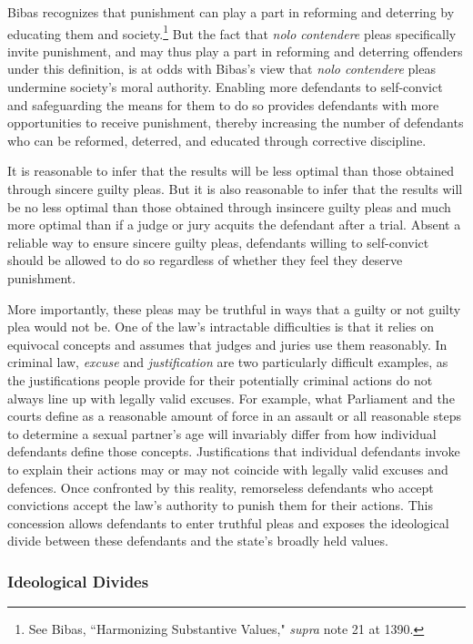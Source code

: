 Bibas recognizes that punishment can play a part in reforming and deterring by educating them and society.\footnote{See Bibas, ``Harmonizing Substantive Values," \textit{supra} note 21 at 1390.} But the fact that \textit{nolo contendere} pleas specifically invite punishment, and may thus play a part in reforming and deterring offenders under this definition, is at odds with Bibas's view that \textit{nolo contendere} pleas undermine society's moral authority. Enabling more defendants to self-convict and safeguarding the means for them to do so provides defendants with more opportunities to receive punishment, thereby increasing the number of defendants who can be reformed, deterred, and educated through corrective discipline. 

It is reasonable to infer that the results will be less optimal than those obtained through sincere guilty pleas. But it is also reasonable to infer that the results will be no less optimal than those obtained through insincere guilty pleas and much more optimal than if a judge or jury acquits the defendant after a trial. Absent a reliable way to ensure sincere guilty pleas, defendants willing to self-convict should be allowed to do so regardless of whether they feel they deserve punishment.

More importantly, these pleas may be truthful in ways that a guilty or not guilty plea would not be. One of the law's intractable difficulties is that it relies on equivocal concepts and assumes that judges and juries use them reasonably. In criminal law, \textit{excuse} and \textit{justification} are two particularly difficult examples, as the justifications people provide for their potentially criminal actions do not always line up with legally valid excuses. For example, what Parliament and the courts define as a reasonable amount of force in an assault or all reasonable steps to determine a sexual partner's age will invariably differ from how individual defendants define those concepts. Justifications that individual defendants invoke to explain their actions may or may not coincide with legally valid excuses and defences. Once confronted by this reality, remorseless defendants who accept convictions accept the law's authority to punish them for their actions. This concession allows defendants to enter truthful pleas and exposes the ideological divide between these defendants and the state's broadly held values.

\subsubsection{Ideological Divides}

